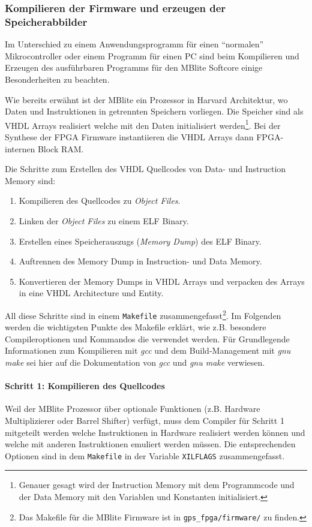 \subsubsection{Kompilieren der Firmware und erzeugen der Speicherabbilder}
Im Unterschied zu einem Anwendungsprogramm für einen \enquote{normalen} Mikrocontroller oder einem Programm für einen PC sind beim Kompilieren und Erzeugen des ausführbaren Programms für den MBlite Softcore einige Besonderheiten zu beachten.

Wie bereits erwähnt ist der MBlite ein Prozessor in Harvard Architektur, wo  Daten und Instruktionen in getrennten Speichern vorliegen. Die Speicher sind als VHDL Arrays realisiert welche mit den Daten initialisiert werden\footnote{Genauer gesagt wird der Instruction Memory mit dem Programmcode und der Data Memory mit den Variablen und Konstanten initialisiert.}. Bei der Synthese der FPGA Firmware instantiieren die VHDL Arrays dann FPGA-internen Block RAM.

Die Schritte zum Erstellen des VHDL Quellcodes von Data- und Instruction Memory sind:
\begin{enumerate}
    \item Kompilieren des Quellcodes zu \emph{Object Files}.
    \item Linken der \emph{Object Files} zu einem \gls{ELF} Binary.
    \item Erstellen eines Speicherauszugs (\emph{Memory Dump}) des \gls{ELF} Binary.
    \item Auftrennen des Memory Dump in Instruction- und Data Memory.
    \item Konvertieren der Memory Dumps in VHDL Arrays und verpacken des Arrays in eine VHDL Architecture und Entity.
\end{enumerate}

All diese Schritte sind in einem \lstinline$Makefile$ zusammengefasst\footnote{Das Makefile für die MBlite Firmware ist in \lstinline$gps_fpga/firmware/$ zu finden.}. Im Folgenden werden die wichtigsten Punkte des Makefile erklärt, wie z.B. besondere Compileroptionen und Kommandos die verwendet werden. Für Grundlegende Informationen zum Kompilieren mit \emph{gcc} und dem Build-Management mit \emph{gnu make} sei hier auf die Dokumentation von \emph{gcc} und \emph{gnu make} verwiesen.

\paragraph{Schritt 1: Kompilieren des Quellcodes}
Weil der MBlite Prozessor über optionale Funktionen  (z.B. Hardware Multiplizierer oder Barrel Shifter) verfügt, muss dem Compiler für Schritt 1 mitgeteilt werden welche Instruktionen in Hardware realisiert werden können und welche mit anderen Instruktionen emuliert werden müssen. Die entsprechenden Optionen sind in dem \lstinline$Makefile$ in der Variable \lstinline$XILFLAGS$ zusammengefasst.

